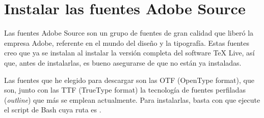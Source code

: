\section{Instalar las fuentes Adobe Source}\label{sec:adobe-source}
Las fuentes Adobe Source son un grupo de fuentes de gran calidad que liberó la empresa Adobe, referente en el
mundo del diseño y la tipografía. Estas fuentes creo que ya se instalan al instalar la versión completa del
software \TeX{} Live, así que, antes de instalarlas, es bueno asegurarse de que no están ya instaladas.

Las fuentes que he elegido para descargar son las OTF (OpenType format), que son, junto con las TTF (TrueType
format) la tecnología de fuentes perfiladas (\foreignlanguage{english}{\emph{outline}}) que más se emplean
actualmente. Para instalarlas, basta con que ejecute el script de Bash cuya ruta es
.%

